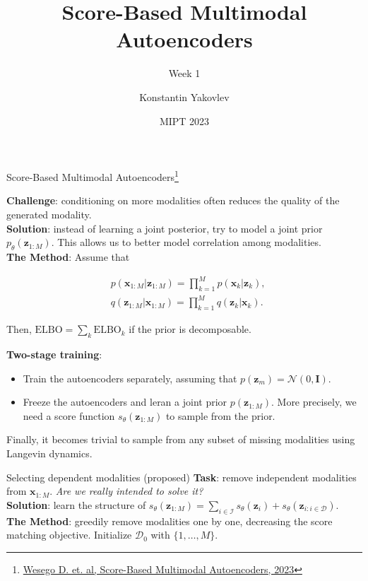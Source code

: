 \documentclass[aspectratio=169]{beamer}
\title[Week 1]
{Score-Based Multimodal Autoencoders}
\subtitle{Week 1}
\author[] %
{
Konstantin Yakovlev \inst{1} \and
}
\institute[] %
{
  \inst{1}%
  MIPT \\
  Moscow, Russia
}
\date[MIPT 2023] %
{MIPT 2023}
\begin{document}
\frame{\titlepage}


\begin{frame}{Score-Based Multimodal Autoencoders\footnote{\href{https://arxiv.org/pdf/2305.15708.pdf}{Wesego D. et. al, Score-Based Multimodal Autoencoders, 2023}}}
    \begin{minipage}{0.49\textwidth}
        \textbf{Challenge}: conditioning on more modalities often reduces the quality of the generated modality. \\
        \textbf{Solution}: instead of learning a joint posterior, try to model a joint prior $p_\theta(\mathbf{z}_{1:M})$.
        This allows us to better model correlation among modalities. \\
        \textbf{The Method}: Assume that
        \begin{small}
        \begin{align*}
            &p(\mathbf{x}_{1:M}|\mathbf{z}_{1:M}) = \prod_{k=1}^Mp(\mathbf{x}_k|\mathbf{z}_k), \\
            &q(\mathbf{z}_{1:M}|\mathbf{x}_{1:M}) = \prod_{k=1}^Mq(\mathbf{z}_k|\mathbf{x}_k).
        \end{align*}
        \end{small}
        Then, $\mathrm{ELBO} = \sum_k\mathrm{ELBO}_k$ if the prior is decomposable.
    \end{minipage}
    \begin{minipage}{0.49\textwidth}
        \textbf{Two-stage training}:
        \begin{itemize}
            \item Train the autoencoders separately, assuming that $p(\mathbf{z}_m) = \mathcal{N}(0, \mathbf{I})$.
            \item Freeze the autoencoders and leran a joint prior $p(\mathbf{z}_{1:M})$.
            More precisely, we need a score function $s_\theta(\mathbf{z}_{1:M})$ to sample from the prior.
        \end{itemize}
        Finally, it becomes trivial to sample from any subset of missing modalities using Langevin dynamics.
    \end{minipage}
    
\end{frame}


\begin{frame}{Selecting dependent modalities (proposed)}
    \textbf{Task}: remove independent modalities from $\mathbf{x}_{1:M}$.
    \textit{Are we really intended to solve it?} \\
    \textbf{Solution}: learn the structure of $s_\theta(\mathbf{z}_{1:M}) = \sum_{i\in \mathcal{I}}s_\theta(\mathbf{z}_i) + 
    s_\theta(\mathbf{z}_{i : i \in \mathcal{D}})$. \\
    \textbf{The Method}: greedily remove modalities one by one, decreasing the score matching objective.
    Initialize $\mathcal{D}_0$ with $\{1, \ldots, M\}$.
    
\end{frame}
\end{document}
